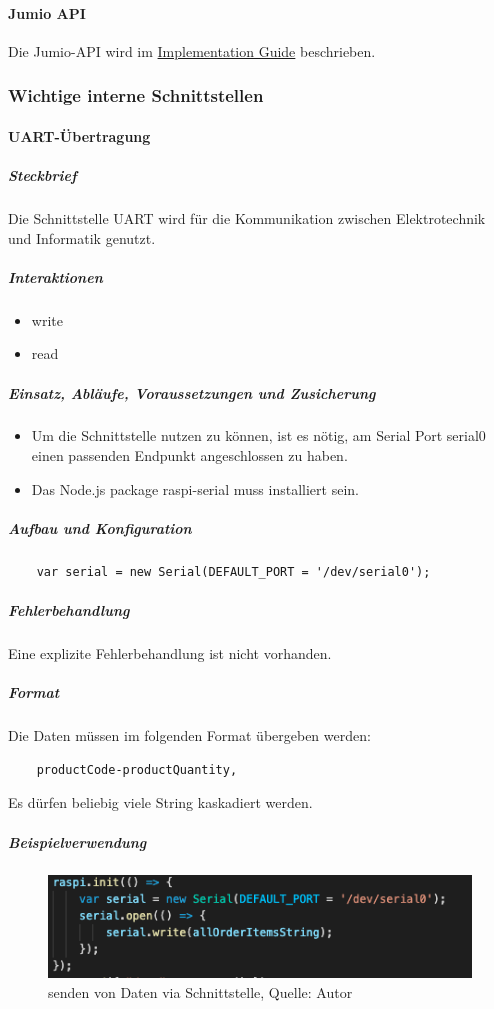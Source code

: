 \paragraph{Jumio API}
Die Jumio-API wird im \href{https://github.com/Jumio/implementation-guides}{Implementation Guide} beschrieben. 
\newpage
\subsubsection{Wichtige interne Schnittstellen}
 \paragraph{UART-Übertragung}
 \subparagraph{Steckbrief}
Die Schnittstelle \ac{UART} wird für die Kommunikation zwischen Elektrotechnik und Informatik genutzt. 
\subparagraph{Interaktionen}
\begin{itemize}
	\item write
	\item read
\end{itemize}
 
 \subparagraph{Einsatz, Abläufe, Voraussetzungen und Zusicherung}
 \begin{itemize}
 	\item Um die Schnittstelle nutzen zu können, ist es nötig, am Serial Port \glqq serial0\grqq{} einen passenden Endpunkt angeschlossen zu haben.  
 	\item Das Node.js package \glqq raspi-serial\grqq{} muss installiert sein.
 \end{itemize}
 
 \subparagraph{Aufbau und Konfiguration}
 \begin{verbatim}
 	var serial = new Serial(DEFAULT_PORT = '/dev/serial0');
 \end{verbatim}
 \subparagraph{Fehlerbehandlung}
Eine explizite Fehlerbehandlung ist nicht vorhanden. 
 
 \subparagraph{Format}
 Die Daten müssen im folgenden Format übergeben werden: 
 \begin{verbatim}
 	productCode-productQuantity, 
 \end{verbatim}
 Es dürfen beliebig viele String kaskadiert werden. 
 \subparagraph{Beispielverwendung}
\begin{figure}[H]
	\centering
	\includegraphics[scale=0.6]{images/sendDataUart.png}
	\caption[Senden von Daten via Schnittstelle]{senden von Daten via Schnittstelle, Quelle: Autor}
	\label{img: send}
\end{figure}

